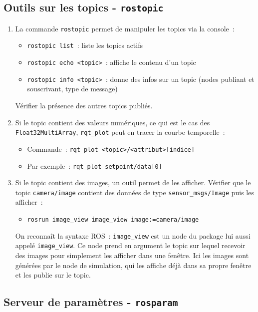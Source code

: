 \documentclass[12pt,a4paper]{article}
\begin{document}
\subsection{Outils sur les topics - \texttt{rostopic}}

\begin{enumerate}
\item La commande \texttt{rostopic} permet de manipuler les topics via la console~:
\begin{itemize}
\item \texttt{rostopic list}~: liste les topics actifs
\item \texttt{rostopic echo <topic>}~: affiche le contenu d'un topic
\item \texttt{rostopic info <topic>}~: donne des infos sur un topic (nodes publiant et souscrivant, type de message)
\end{itemize}
Vérifier la présence des autres topics publiés.
\item Si le topic contient des valeurs numériques, ce qui est le cas des \texttt{Float32MultiArray}, \texttt{rqt\_plot} peut en tracer la courbe temporelle~: 
\begin{itemize}
\item Commande~: \texttt{rqt\_plot <topic>/<attribut>[indice] }
\item Par exemple~: \texttt{rqt\_plot setpoint/data[0]}
\end{itemize}
\item Si le topic contient des images, un outil permet de les afficher. Vérifier que le topic \texttt{camera/image} contient des données de type \texttt{sensor\_msgs/Image} puis les afficher~:
\begin{itemize}
\item \texttt{rosrun image\_view image\_view image:=camera/image}
\end{itemize}
On reconnaît la syntaxe ROS~: \texttt{image\_view} est un node du package lui aussi appelé \texttt{image\_view}. Ce node prend en argument le topic sur lequel recevoir des images pour simplement les afficher dans une fenêtre.
Ici les images sont générées par le node de simulation, qui les affiche déjà dans sa propre fenêtre et les publie sur le topic.
\end{enumerate}
    
\subsection{Serveur de paramètres - \texttt{rosparam}}
\end{document}
